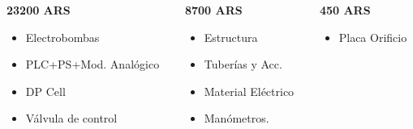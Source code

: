 {\begin{columns}[T]
	 \begin{column}{0.3\textwidth}
	    \begin{techintblock}
		\centering
		\textbf{23200 ARS}
	    \end{techintblock}
	    \footnotesize
	    \begin{itemize}
	     \item Electrobombas
	     \item PLC+PS+Mod. Analógico
	     \item DP Cell
	     \item Válvula de control
	    \end{itemize}
	 \end{column}
	 
	 \begin{column}{0.3\textwidth}
	    \begin{fingblock}
		\centering
		\textbf{8700 ARS}
	    \end{fingblock}
	    \footnotesize
	     \begin{itemize}
	      \item Estructura
	      \item Tuberías y Acc.
	      \item Material Eléctrico
	      \item Manómetros.
	     \end{itemize}
	 \end{column}

	 \begin{column}{0.3\textwidth}
	    \begin{puglesiblock}
		\centering
		\textbf{450 ARS}
	    \end{puglesiblock}
	    \footnotesize
	    \begin{itemize}
	     \item Placa Orificio
	    \end{itemize}

	 \end{column}
	\end{columns}
}

